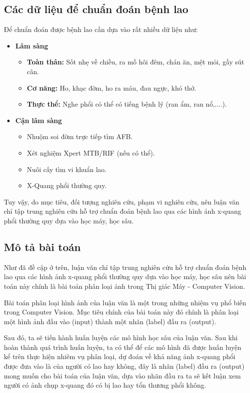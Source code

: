 \subsection{Các dữ liệu để chuẩn đoán bệnh lao}
Để chuẩn đoán được bệnh lao cần dựa vào rất nhiều dữ liệu \cite{bytchuandoanlao} như: 
\begin{itemize}
	\item {\bfseries Lâm sàng}
	\begin{itemize}
		\item {\bfseries Toàn thân:} Sốt nhẹ về chiều, ra mồ hôi đêm, chán ăn, mệt mỏi, gầy sút cân.
		\item {\bfseries Cơ năng:} Ho, khạc đờm, ho ra máu, đau ngực, khó thở.
		\item {\bfseries Thực thể:} Nghe phổi có thể có tiếng bệnh lý (ran ẩm, ran nổ,....).
	\end{itemize}
	\item {\bfseries Cận lâm sàng}
	\begin{itemize}
		\item Nhuộm soi đờm trực tiếp tìm AFB.
		\item Xét nghiệm Xpert MTB/RIF (nếu có thể).
		\item Nuôi cấy tìm vi khuẩn lao.
		\item X-Quang phổi thường quy.
	\end{itemize}
\end{itemize}

Tuy vậy, do mục tiêu, đối tượng nghiên cứu, phạm vi nghiên cứu, nên luận văn chỉ tập trung nghiên cứu hỗ trợ chuẩn đoán bệnh lao qua các hình ảnh x-quang phổi thường quy dựa vào học máy, học sâu.

\subsection{Mô tả bài toán}
Như đã đề cập ở trên, luận văn chỉ tập trung nghiên cứu hỗ trợ chuẩn đoán bệnh lao qua các hình ảnh x-quang phổi thường quy dựa vào học máy, học sâu nên bài toán này chính là bài toán phân loại ảnh trong Thị giác Máy - Computer Vision.

Bài toán phân loại hình ảnh của luận văn là một trong những nhiệm vụ phổ biến trong Computer Vision. Mục tiêu chính của bài toán này đó chính là phân loại một hình ảnh đầu vào (input) thành một nhãn (label) đầu ra (output).  

Sau đó, ta sẽ tiến hành huấn luyện các mô hình học sâu của luận văn. Sau khi hoàn thành quá trình huấn luyện, ta có thể để các mô hình đã được huấn luyện kể trên thực hiện nhiêm vụ phân loại, dự đoán về khả năng ảnh x-quang phổi được đưa vào là của người có lao hay không, đây là nhãn (label) đầu ra (output) mong muốn cho bài toán của luận văn, dựa vào nhãn đầu ra ta sẽ kết luận xem người có ảnh chụp x-quang đó có bị lao hay tổn thương phổi không. 